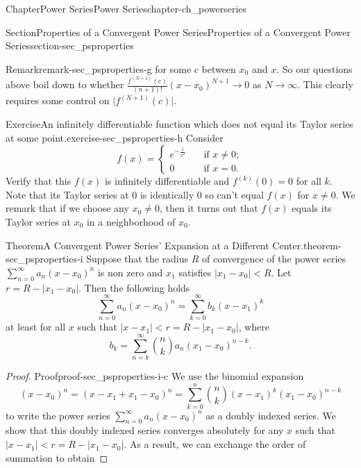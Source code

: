 \documentclass[oneside,10pt,]{book}
\numberwithin{equation}{section}
\newcommand{\lt}{<}
\newcommand{\amp}{&}
\begin{document}
\begin{chapterptx}{Chapter}{Power Series}{}{Power Series}{}{}{chapter-ch_powerseries}
\begin{sectionptx}{Section}{Properties of a Convergent Power Series}{}{Properties of a Convergent Power Series}{}{}{section-sec_psproperties}
\begin{remark}{Remark}{}{remark-sec_psproperties-g}
for some \(c\) between \(x_{0}\) and \(x\). So our questions above boil down to whether \(\frac{f^{(N+1)}(c)}{(n+1)!}(x-x_{0})^{N+1}\to 0\) as \(N\to \infty\). This clearly requires some control on \(\vert f^{(N+1)}(c)\vert\).%
\end{remark}
\begin{inlineexercise}{Exercise}{An infinitely differentiable function which does not equal its Taylor series at some point.}{exercise-sec_psproperties-h}%
Consider%
\begin{equation*}
f(x)=\begin{cases} e^{-\frac{1}{x^{2}}} \amp\quad\text{if $x\ne 0$};\\
0\amp\quad\text{if $x=0$}.
\end{cases}
\end{equation*}
Verify that this \(f(x)\) is infinitely differentiable and \(f^{(k)}(0)=0\) for all \(k\). Note that its Taylor series at \(0\) is identically \(0\) so can't equal \(f(x)\) for \(x\ne 0\).  We remark that if we choose any \(x_{0}\ne 0\), then it turns out that \(f(x)\) equals its Taylor series at \(x_{0}\) in a neighborhood of \(x_{0}\).%
\end{inlineexercise}%
\begin{theorem}{Theorem}{A Convergent Power Series' Expansion at a Different Center.}{}{theorem-sec_psproperties-i}%
Suppose that the radius \(R\) of convergence of the power series \(\sum_{n=0}^{\infty} a_{n}(x-x_{0})^{n}\) is non zero and \(x_{1}\) satisfies \(|x_{1}-x_{0}| \lt R\). Let \(r=R- |x_{1}-x_{0}| \). Then the following holds%
\begin{equation*}
\sum_{n=0}^{\infty} a_{n}(x-x_{0})^{n}=\sum_{k=0}^{\infty} b_{k}(x-x_{1})^{k}
\end{equation*}
at least for all \(x\) such that \(|x-x_{1}| \lt r=R- |x_{1}-x_{0}| \), where%
\begin{equation*}
b_{k}=\sum_{n=k}^{\infty} \binom{n}{k} a_{n}(x_{1}-x_{0})^{n-k}.
\end{equation*}
\end{theorem}
\begin{proof}{Proof}{}{proof-sec_psproperties-i-c}
We use the binomial expansion%
\begin{equation*}
(x-x_{0})^{n}=(x-x_{1}+x_{1}-x_{0})^{n}=\sum_{k=0}^{n}\binom{n}{k} (x-x_{1})^{k}  (x_{1}-x_{0})^{n-k}
\end{equation*}
to write the power series \(\sum_{n=0}^{\infty} a_{n}(x-x_{0})^{n}\) as a doubly indexed series. We show that this doubly indexed series converges absolutely for any \(x\) such that  \(|x-x_{1}| \lt r=R- |x_{1}-x_{0}| \). As a result, we can exchange the order of summation to obtain%

\end{proof}
\end{sectionptx}
\end{chapterptx}
\end{document}
